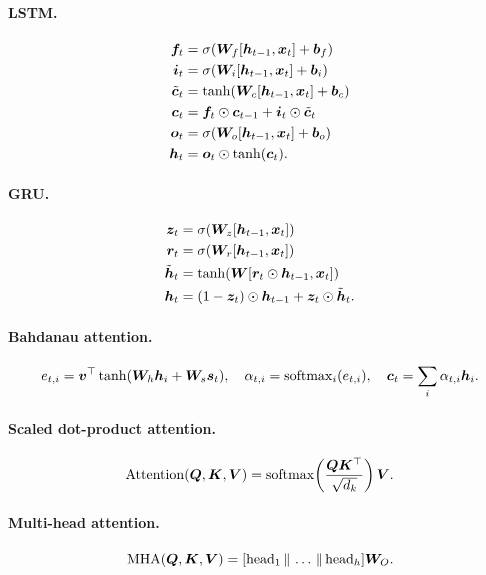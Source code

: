 \paragraph{LSTM.}
\[
\begin{aligned}
\bm{f}_t &= \sigma(\bm{W}_f[\bm{h}_{t-1}, \bm{x}_t] + \bm{b}_f)\\
\bm{i}_t &= \sigma(\bm{W}_i[\bm{h}_{t-1}, \bm{x}_t] + \bm{b}_i)\\
\tilde{\bm{c}}_t &= \tanh(\bm{W}_c[\bm{h}_{t-1}, \bm{x}_t] + \bm{b}_c)\\
\bm{c}_t &= \bm{f}_t \odot \bm{c}_{t-1} + \bm{i}_t \odot \tilde{\bm{c}}_t\\
\bm{o}_t &= \sigma(\bm{W}_o[\bm{h}_{t-1}, \bm{x}_t] + \bm{b}_o)\\
\bm{h}_t &= \bm{o}_t \odot \tanh(\bm{c}_t).
\end{aligned}
\]

\paragraph{GRU.}
\[
\begin{aligned}
\bm{z}_t &= \sigma(\bm{W}_z[\bm{h}_{t-1},\bm{x}_t])\\
\bm{r}_t &= \sigma(\bm{W}_r[\bm{h}_{t-1},\bm{x}_t])\\
\tilde{\bm{h}}_t &= \tanh(\bm{W}[\bm{r}_t\odot\bm{h}_{t-1}, \bm{x}_t])\\
\bm{h}_t &= (1-\bm{z}_t)\odot\bm{h}_{t-1} + \bm{z}_t\odot\tilde{\bm{h}}_t.
\end{aligned}
\]

\paragraph{Bahdanau attention.}
\[
e_{t,i} = \bm{v}^\top \tanh(\bm{W}_h \bm{h}_i + \bm{W}_s \bm{s}_t), \quad \alpha_{t,i} = \mathrm{softmax}_i(e_{t,i}), \quad \bm{c}_t = \sum_i \alpha_{t,i} \bm{h}_i.
\]

\paragraph{Scaled dot-product attention.}
\[
\mathrm{Attention}(\bm{Q}, \bm{K}, \bm{V}) = \mathrm{softmax}\!\left(\frac{\bm{Q}\bm{K}^\top}{\sqrt{d_k}}\right) \bm{V}.
\]

\paragraph{Multi-head attention.}
\[
\mathrm{MHA}(\bm{Q},\bm{K},\bm{V}) = [\mathrm{head}_1 \,\|\, \dots \,\|\, \mathrm{head}_h] \bm{W}_O.
\]


